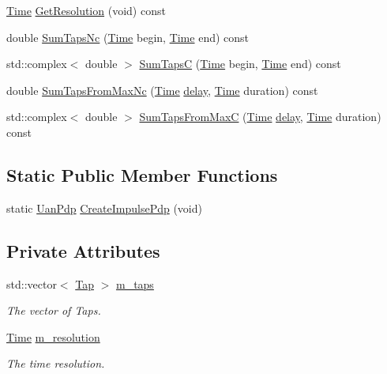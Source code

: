 \begin{DoxyCompactItemize}
\item 
\hyperlink{classns3_1_1Time}{Time} \hyperlink{classns3_1_1UanPdp_aea54db38c17d733eb1c09d0d0fab1685}{Get\+Resolution} (void) const 
\item 
double \hyperlink{classns3_1_1UanPdp_ae0dcc462b261f598ef93461c7b2b2c7c}{Sum\+Taps\+Nc} (\hyperlink{classns3_1_1Time}{Time} begin, \hyperlink{classns3_1_1Time}{Time} end) const 
\item 
std\+::complex$<$ double $>$ \hyperlink{classns3_1_1UanPdp_ad411614f76689f5479bd81fc9ee70e27}{Sum\+TapsC} (\hyperlink{classns3_1_1Time}{Time} begin, \hyperlink{classns3_1_1Time}{Time} end) const 
\item 
double \hyperlink{classns3_1_1UanPdp_a7df1e7a43fecc51c977f30c64a8821de}{Sum\+Taps\+From\+Max\+Nc} (\hyperlink{classns3_1_1Time}{Time} \hyperlink{mmwave_2model_2fading-traces_2fading__trace__generator_8m_a7964e6aa8f61a9d28973c8267a606ad8}{delay}, \hyperlink{classns3_1_1Time}{Time} duration) const 
\item 
std\+::complex$<$ double $>$ \hyperlink{classns3_1_1UanPdp_a535dd31f8cd9181cf6b6f2bf0ecf2ba4}{Sum\+Taps\+From\+MaxC} (\hyperlink{classns3_1_1Time}{Time} \hyperlink{mmwave_2model_2fading-traces_2fading__trace__generator_8m_a7964e6aa8f61a9d28973c8267a606ad8}{delay}, \hyperlink{classns3_1_1Time}{Time} duration) const 
\end{DoxyCompactItemize}
\subsection*{Static Public Member Functions}
\begin{DoxyCompactItemize}
\item 
static \hyperlink{classns3_1_1UanPdp}{Uan\+Pdp} \hyperlink{classns3_1_1UanPdp_a9bca35a5402288c06e2ba0197b25b053}{Create\+Impulse\+Pdp} (void)
\end{DoxyCompactItemize}
\subsection*{Private Attributes}
\begin{DoxyCompactItemize}
\item 
std\+::vector$<$ \hyperlink{classns3_1_1Tap}{Tap} $>$ \hyperlink{classns3_1_1UanPdp_a4b340fa551ee269c44dabe6ffb4546fb}{m\+\_\+taps}
\begin{DoxyCompactList}\small\item\em The vector of Taps. \end{DoxyCompactList}\item 
\hyperlink{classns3_1_1Time}{Time} \hyperlink{classns3_1_1UanPdp_aac76e20be14850246e29cebc09468fa4}{m\+\_\+resolution}
\begin{DoxyCompactList}\small\item\em The time resolution. \end{DoxyCompactList}\end{DoxyCompactItemize}
